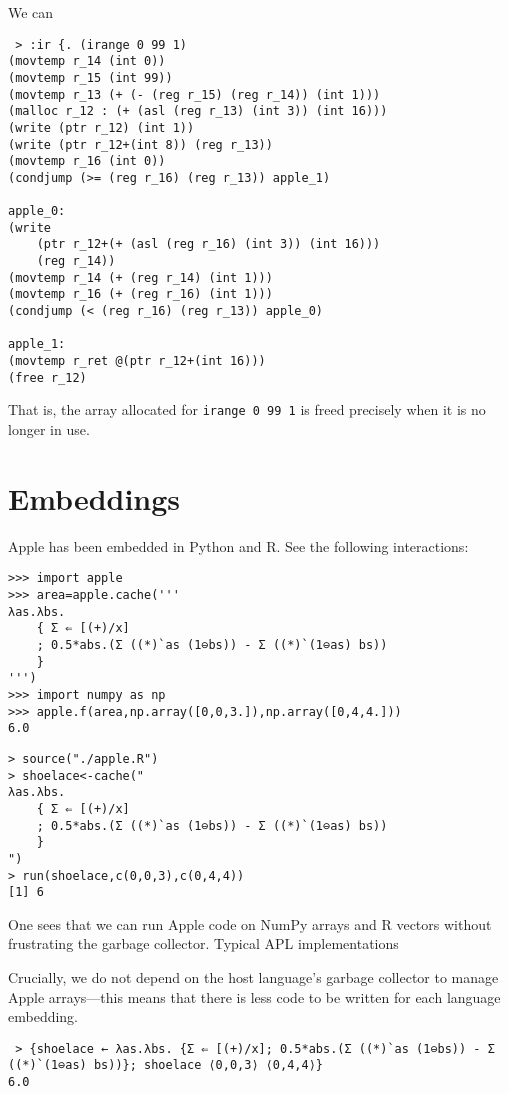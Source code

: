 \documentclass[sigplan,screen]{acmart}
\begin{document}
We can

\begin{verbatim}
 > :ir {. (irange 0 99 1)
(movtemp r_14 (int 0))
(movtemp r_15 (int 99))
(movtemp r_13 (+ (- (reg r_15) (reg r_14)) (int 1)))
(malloc r_12 : (+ (asl (reg r_13) (int 3)) (int 16)))
(write (ptr r_12) (int 1))
(write (ptr r_12+(int 8)) (reg r_13))
(movtemp r_16 (int 0))
(condjump (>= (reg r_16) (reg r_13)) apple_1)

apple_0:
(write
    (ptr r_12+(+ (asl (reg r_16) (int 3)) (int 16)))
    (reg r_14))
(movtemp r_14 (+ (reg r_14) (int 1)))
(movtemp r_16 (+ (reg r_16) (int 1)))
(condjump (< (reg r_16) (reg r_13)) apple_0)

apple_1:
(movtemp r_ret @(ptr r_12+(int 16)))
(free r_12)
\end{verbatim}

That is, the array allocated for {\tt irange 0 99 1} is freed precisely when it is no longer in use.

\section{Embeddings}

Apple has been embedded in Python and R. See the following interactions:

\begin{verbatim}
>>> import apple
>>> area=apple.cache('''
λas.λbs.
    { Σ ⇐ [(+)/x]
    ; 0.5*abs.(Σ ((*)`as (1⊖bs)) - Σ ((*)`(1⊖as) bs))
    }
''')
>>> import numpy as np
>>> apple.f(area,np.array([0,0,3.]),np.array([0,4,4.]))
6.0
\end{verbatim}

\begin{verbatim}
> source("./apple.R")
> shoelace<-cache("
λas.λbs.
    { Σ ⇐ [(+)/x]
    ; 0.5*abs.(Σ ((*)`as (1⊖bs)) - Σ ((*)`(1⊖as) bs))
    }
")
> run(shoelace,c(0,0,3),c(0,4,4))
[1] 6
\end{verbatim}

One sees that we can run Apple code on NumPy arrays and R vectors without frustrating the garbage collector. Typical APL implementations 

Crucially, we do not depend on the host language's garbage collector to manage Apple arrays---this means that there is less code to be written for each language embedding.

\begin{verbatim}
 > {shoelace ← λas.λbs. {Σ ⇐ [(+)/x]; 0.5*abs.(Σ ((*)`as (1⊖bs)) - Σ ((*)`(1⊖as) bs))}; shoelace ⟨0,0,3⟩ ⟨0,4,4⟩}
6.0
\end{verbatim}
\end{document}
